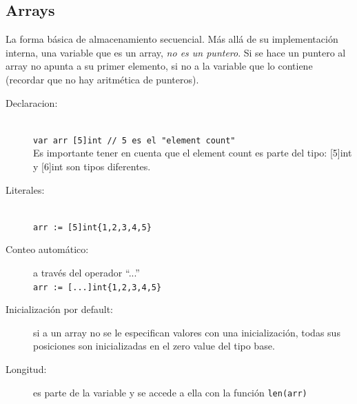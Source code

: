 \documentclass{article}
\begin{document}
\subsection{Arrays}
La forma básica de almacenamiento secuencial. Más allá de su implementación interna, una variable que es un array, \emph{no es un puntero}. Si se hace un puntero al array no apunta a su primer elemento, si no a la variable que lo contiene (recordar que no hay aritmética de punteros).
\begin{description}
	\item[Declaracion:] \hfill \\
	\lstinline|var arr [5]int // 5 es el "element count"|\\
	Es importante tener en cuenta que el element count es parte del tipo: [5]int y [6]int son tipos diferentes.
	\item[Literales:] \hfill \\
		\lstinline|arr := [5]int{1,2,3,4,5}|
	\item[Conteo automático:] a través del operador ``...'' \\
		\lstinline|arr := [...]int{1,2,3,4,5}|
	\item[Inicialización por default:]  si a un array no se le especifican valores con una inicialización, todas sus posiciones son inicializadas en el zero value del tipo base.
	\item[Longitud:] es parte de la variable y se accede a ella con la función \lstinline|len(arr)|
\end{description}
\end{document}
